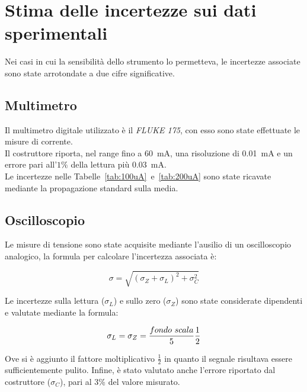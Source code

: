 \documentclass[../main.tex]{subfiles}
\begin{document}
\section{Stima delle incertezze sui dati sperimentali}
  \label{sec:propagazione-errori-misure}
  Nei casi in cui la sensibilità dello strumento lo permetteva, le incertezze associate sono
  state arrotondate a due cifre significative.
  \subsection*{Multimetro}
    Il multimetro digitale utilizzato è il \textit{FLUKE 175}, con
    esso sono state effettuate le misure di corrente.\\
    Il costruttore riporta, nel range fino a 60~mA, una risoluzione
    di 0.01~mA e un errore pari all'$1\%$ della lettura più 0.03~mA.\\

    \noindent Le incertezze nelle Tabelle~\ref{tab:100uA}~e~\ref{tab:200uA}
    sono state ricavate mediante la propagazione standard sulla
    media.

  \subsection*{Oscilloscopio}
    \noindent Le misure di tensione sono state acquisite mediante l'ausilio di un oscilloscopio analogico,
    la formula per calcolare l'incertezza associata è:

    \begin{equation*}
      \sigma = \sqrt {\left( \sigma_Z + \sigma_L  \right)^2 + \sigma_C^2}
    \end{equation*}

    \vspace{0.1cm}
    \noindent Le incertezze sulla lettura ($\sigma_L$) e sullo zero ($\sigma_Z$) sono state considerate dipendenti
    e valutate mediante la formula:
    \vspace{0.1cm}


    \begin{equation*}
      \sigma_L = \sigma_Z = \frac{fondo\textnormal{ }scala}{5} \frac{1}{2}
    \end{equation*}

    \noindent Ove si è aggiunto il fattore moltiplicativo $\frac{1}{2}$ in quanto il segnale risultava
    essere sufficientemente pulito.\newline\newline
    \noindent Infine, è stato valutato anche l'errore riportato dal costruttore ($\sigma_C$), pari
    al 3\% del valore misurato.
\end{document}
